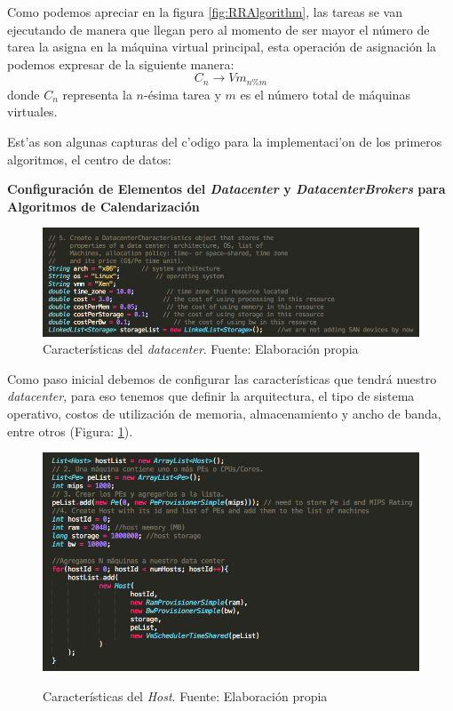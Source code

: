 Como podemos apreciar en la figura \ref{fig:RRAlgorithm}, las tareas se van ejecutando de manera que llegan pero al momento de ser mayor el número de tarea la asigna en la máquina virtual principal, esta operación de asignación la podemos expresar de la siguiente manera: $$C_n \rightarrow Vm_{n \% m}$$ donde $C_n$ representa la $n$-ésima tarea y $m$ es el número total de máquinas virtuales.

\newpage 



Est'as son algunas capturas del c'odigo para la implementaci'on de los primeros algoritmos, el centro de datos:

\textbf{Configuración de Elementos del \textit{Datacenter} y \textit{DatacenterBrokers} para Algoritmos de Calendarización}

\renewcommand\thefigure{\arabic{figure}}
\begin{figure}[h!]
	\centering
	\includegraphics[scale=0.4]{media/caracteristicas_datacenter}
	\caption{Características del \textit{datacenter}. Fuente: Elaboración propia}
	\label{fig:DCar}
\end{figure}

Como paso inicial debemos de configurar las características que tendrá nuestro \textit{datacenter}, para eso tenemos que definir la arquitectura, el tipo de sistema operativo, costos de utilización de memoria, almacenamiento y ancho de banda, entre otros (Figura: \ref{fig:DCar}).

\renewcommand\thefigure{\arabic{figure}}
\begin{figure}[h!]
	\centering
	\includegraphics[scale=0.4]{media/caracteristicas_host}
	\label{fig:HCar}
	\caption{Características del \textit{Host}. Fuente: Elaboración propia}
\end{figure}

